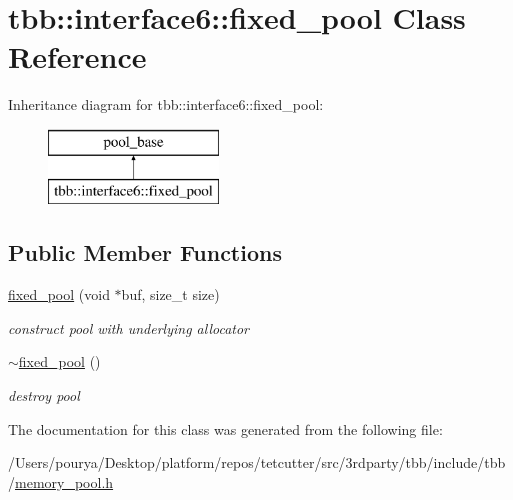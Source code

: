 \hypertarget{classtbb_1_1interface6_1_1fixed__pool}{}\section{tbb\+:\+:interface6\+:\+:fixed\+\_\+pool Class Reference}
\label{classtbb_1_1interface6_1_1fixed__pool}
Inheritance diagram for tbb\+:\+:interface6\+:\+:fixed\+\_\+pool\+:\begin{figure}[H]
\begin{center}
\leavevmode
\includegraphics[height=2.000000cm]{classtbb_1_1interface6_1_1fixed__pool}
\end{center}
\end{figure}
\subsection*{Public Member Functions}
\begin{DoxyCompactItemize}
\item 
\hypertarget{classtbb_1_1interface6_1_1fixed__pool_aa3811fe3d437ba2eefa926d52732491a}{}\hyperlink{classtbb_1_1interface6_1_1fixed__pool_aa3811fe3d437ba2eefa926d52732491a}{fixed\+\_\+pool} (void $\ast$buf, size\+\_\+t size)\label{classtbb_1_1interface6_1_1fixed__pool_aa3811fe3d437ba2eefa926d52732491a}

\begin{DoxyCompactList}\small\item\em construct pool with underlying allocator \end{DoxyCompactList}\item 
\hypertarget{classtbb_1_1interface6_1_1fixed__pool_ab854a85575e5c1e9c9f4d3eafcc28044}{}\hyperlink{classtbb_1_1interface6_1_1fixed__pool_ab854a85575e5c1e9c9f4d3eafcc28044}{$\sim$fixed\+\_\+pool} ()\label{classtbb_1_1interface6_1_1fixed__pool_ab854a85575e5c1e9c9f4d3eafcc28044}

\begin{DoxyCompactList}\small\item\em destroy pool \end{DoxyCompactList}\end{DoxyCompactItemize}


The documentation for this class was generated from the following file\+:\begin{DoxyCompactItemize}
\item 
/\+Users/pourya/\+Desktop/platform/repos/tetcutter/src/3rdparty/tbb/include/tbb/\hyperlink{memory__pool_8h}{memory\+\_\+pool.\+h}\end{DoxyCompactItemize}
